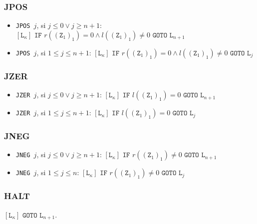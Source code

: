 \documentclass[twoside]{article}
\begin{document}
\subsubsection{JPOS}
\begin{itemize}
\item \texttt{JPOS }$j$, si $j\leq 0\lor j\geq n+1$:
$[\texttt{L}_\kappa]\texttt{ IF }r((\texttt{Z}_1)_1)= 0\land l((\texttt{Z}_1)_1)\neq 0\texttt{ GOTO }\texttt{L}_{n+1}$

\item \texttt{JPOS }$j$, si $1\leq j\leq n+1$:
$[\texttt{L}_\kappa]\texttt{ IF }r((\texttt{Z}_1)_1)= 0\land l((\texttt{Z}_1)_1)\neq 0\texttt{ GOTO }\texttt{L}_{j}$
\end{itemize}
\subsubsection{JZER}
\begin{itemize}
\item \texttt{JZER }$j$, si $j\leq 0\lor j\geq n+1$:
$[\texttt{L}_\kappa]\texttt{ IF } l((\texttt{Z}_1)_1)= 0\texttt{ GOTO }\texttt{L}_{n+1}$

\item \texttt{JZER }$j$, si $1\leq j\leq n+1$:
$[\texttt{L}_\kappa]\texttt{ IF } l((\texttt{Z}_1)_1)= 0\texttt{ GOTO }\texttt{L}_{j}$
\end{itemize}

\subsubsection{JNEG}
\begin{itemize}
\item \texttt{JNEG }$j$, si $j\leq 0\lor j\geq n+1$:
$[\texttt{L}_\kappa]\texttt{ IF } r((\texttt{Z}_1)_1)\neq 0\texttt{ GOTO }\texttt{L}_{n+1}$

\item \texttt{JNEG }$j$, si $1\leq j\leq n$:
$[\texttt{L}_\kappa]\texttt{ IF } r((\texttt{Z}_1)_1)\neq 0\texttt{ GOTO }\texttt{L}_{j}$
\end{itemize}

\subsubsection{HALT}
$[\texttt{L}_\kappa]\texttt{ GOTO }\texttt{L}_{n+1}$. 
\end{document}
